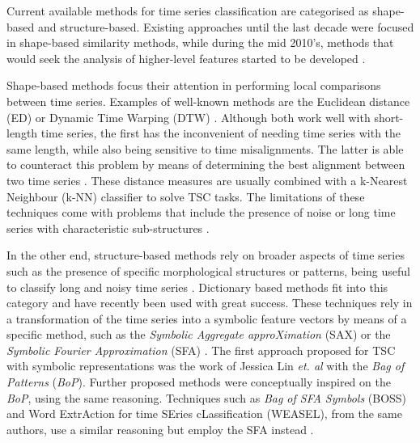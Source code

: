 Current available methods for time series classification are categorised as shape-based and structure-based. Existing approaches until the last decade were focused in shape-based similarity methods, while during the mid 2010's, methods that would seek the analysis of higher-level features started to be developed \cite{Keogh2004}.
\par
Shape-based methods focus their attention in performing local comparisons between time series. Examples of well-known methods are the Euclidean distance (ED) or Dynamic Time Warping (DTW) \cite{jlin2013}. Although both work well with short-length time series, the first has the inconvenient of needing time series with the same length, while also being sensitive to time misalignments. The latter is able to counteract this problem by means of determining the best alignment between two time series \cite{Keogh2004, jlin2013}. These distance measures are usually combined with a k-Nearest Neighbour (k-NN) classifier to solve TSC tasks. The limitations of these techniques come with problems that include the presence of noise or long time series with characteristic sub-structures \cite{BOSS}.
\par
In the other end, structure-based methods rely on broader aspects of time series such as the presence of specific morphological structures or patterns, being useful to classify long and noisy time series \cite{BOSS}. Dictionary based methods fit into this category and have recently been used with great success. These techniques rely in a transformation of the time series into a symbolic feature vectors by means of a specific method, such as the \textit{Symbolic Aggregate approXimation} (SAX) \cite{sax} or the \textit{Symbolic Fourier Approximation} (SFA) \cite{SFA}. The first approach proposed for TSC with symbolic representations was the work of Jessica Lin \textit{et. al} with the \textit{Bag of Patterns} (\textit{BoP})\cite{jlin2013}. Further proposed methods were conceptually inspired on the \textit{BoP}, using the same reasoning. Techniques such as \textit{Bag of SFA Symbols} (BOSS) and Word ExtrAction for time SEries cLassification (WEASEL), from the same authors, use a similar reasoning but employ the SFA instead \cite{BOSS, weasle}.
\par
